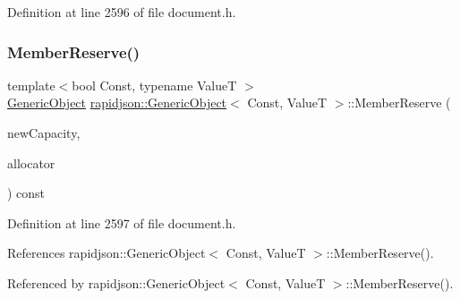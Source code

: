 Definition at line 2596 of file document.\+h.


\begin{DoxyCode}{0}

\end{DoxyCode}
\mbox{\label{classrapidjson_1_1_generic_object_afcd9124531e6c55ba44c2de99b2f9bf1}} 
\subsubsection{\texorpdfstring{MemberReserve()}{MemberReserve()}}
{\footnotesize\ttfamily template$<$bool Const, typename ValueT $>$ \\
\mbox{\hyperlink{classrapidjson_1_1_generic_object}{Generic\+Object}} \mbox{\hyperlink{classrapidjson_1_1_generic_object}{rapidjson\+::\+Generic\+Object}}$<$ Const, ValueT $>$\+::Member\+Reserve (\begin{DoxyParamCaption}\item[{\mbox{\hyperlink{namespacerapidjson_a44eb33eaa523e36d466b1ced64b85c84}{Size\+Type}}}]{new\+Capacity,  }\item[{\mbox{\hyperlink{classrapidjson_1_1_generic_object_ae30003e248368737382eed69ec8fe1eb}{Allocator\+Type}} \&}]{allocator }\end{DoxyParamCaption}) const}



Definition at line 2597 of file document.\+h.


\begin{DoxyCode}{0}

\end{DoxyCode}


References rapidjson\+::\+Generic\+Object$<$ Const, Value\+T $>$\+::\+Member\+Reserve().



Referenced by rapidjson\+::\+Generic\+Object$<$ Const, Value\+T $>$\+::\+Member\+Reserve().

